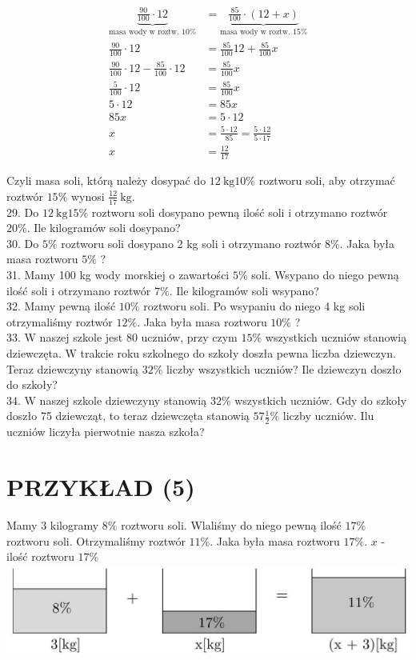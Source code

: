 \documentclass[10pt]{article}
\begin{document}
\[
\begin{aligned}
\underbrace{\frac{90}{100} \cdot 12}_{\text {masa wody w roztw. } 10 \%} & =\underbrace{\frac{85}{100} \cdot(12+x)}_{\text {masa wody w roztw. } 15 \%} \\
\frac{90}{100} \cdot 12 & =\frac{85}{100} 12+\frac{85}{100} x \\
\frac{90}{100} \cdot 12-\frac{85}{100} \cdot 12 & =\frac{85}{100} x \\
\frac{5}{100} \cdot 12 & =\frac{85}{100} x \\
5 \cdot 12 & =85 x \\
85 x & =5 \cdot 12 \\
x & =\frac{5 \cdot 12}{85}=\frac{5 \cdot 12}{5 \cdot 17} \\
x & =\frac{12}{17}
\end{aligned}
\]

Czyli masa soli, którą należy dosypać do \(12 \mathrm{~kg} 10 \%\) roztworu soli, aby otrzymać roztwór \(15 \%\) wynosi \(\frac{12}{17} \mathrm{~kg}\).\\
29. Do \(12 \mathrm{~kg} 15 \%\) roztworu soli dosypano pewną ilość soli i otrzymano roztwór \(20 \%\). Ile kilogramów soli dosypano?\\
30. Do \(5 \%\) roztworu soli dosypano 2 kg soli i otrzymano roztwór \(8 \%\). Jaka była masa roztworu \(5 \%\) ?\\
31. Mamy 100 kg wody morskiej o zawartości \(5 \%\) soli. Wsypano do niego pewną ilość soli i otrzymano roztwór \(7 \%\). Ile kilogramów soli wsypano?\\
32. Mamy pewną ilość \(10 \%\) roztworu soli. Po wsypaniu do niego 4 kg soli otrzymaliśmy roztwór \(12 \%\). Jaka była masa roztworu \(10 \%\) ?\\
33. W naszej szkole jest 80 uczniów, przy czym \(15 \%\) wszystkich uczniów stanowią dziewczęta. W trakcie roku szkolnego do szkoły doszła pewna liczba dziewczyn. Teraz dziewczyny stanowią \(32 \%\) liczby wszystkich uczniów? Ile dziewczyn doszło do szkoły?\\
34. W naszej szkole dziewczyny stanowią \(32 \%\) wszystkich uczniów. Gdy do szkoły doszło 75 dziewcząt, to teraz dziewczęta stanowią \(57 \frac{1}{2} \%\) liczby uczniów. Ilu uczniów liczyła pierwotnie nasza szkoła?

\section*{PRZYKŁAD (5)}
Mamy 3 kilogramy \(8 \%\) roztworu soli. Wlaliśmy do niego pewną ilość \(17 \%\) roztworu soli. Otrzymaliśmy roztwór \(11 \%\). Jaka była masa roztworu \(17 \%\). \(x\) - ilość roztworu \(17 \%\)\\
\includegraphics[max width=\textwidth, center]{2024_11_21_8f01584889ff06348ae7g-154}
\end{document}
